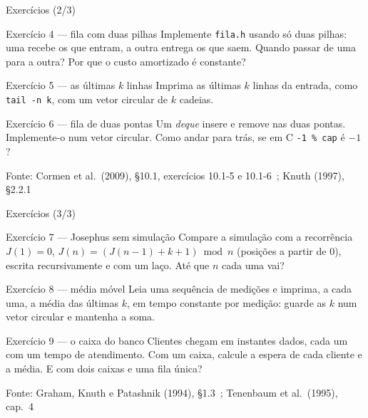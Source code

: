 \documentclass[aspectratio=169]{beamer}
\newcommand{\fonte}[1]{\vfill\hfill{\scriptsize\textcolor{UFSGray}{Fonte: #1}}}
\begin{document}
\begin{frame}{Exercícios (2/3)}
  \footnotesize
  \begin{block}{Exercício 4 --- fila com duas pilhas}
    Implemente \texttt{fila.h} usando só duas pilhas: uma recebe os que
    entram, a outra entrega os que saem. Quando passar de uma para a outra?
    Por que o custo amortizado é constante?
  \end{block}
  \begin{block}{Exercício 5 --- as últimas $k$ linhas}
    Imprima as últimas $k$ linhas da entrada, como \texttt{tail -n k}, com
    um vetor circular de $k$ cadeias.
  \end{block}
  \begin{block}{Exercício 6 --- fila de duas pontas}
    Um \emph{deque} insere e remove nas duas pontas. Implemente-o num vetor
    circular. Como andar para trás, se em C \texttt{-1 \% cap} é $-1$?
  \end{block}
  \fonte{Cormen et al.\ (2009), §10.1, exercícios 10.1-5 e 10.1-6~\cite{cormen2009introduction};
    Knuth (1997), §2.2.1~\cite{knuth1997art}}
\end{frame}

\begin{frame}{Exercícios (3/3)}
  \footnotesize
  \begin{block}{Exercício 7 --- Josephus sem simulação}
    Compare a simulação com a recorrência $J(1) = 0$,
    $J(n) = (J(n-1) + k + 1) \bmod n$ (posições a partir de 0), escrita
    recursivamente e com um laço. Até que $n$ cada uma vai?
  \end{block}
  \begin{block}{Exercício 8 --- média móvel}
    Leia uma sequência de medições e imprima, a cada uma, a média das últimas
    $k$, em tempo constante por medição: guarde as $k$ num vetor circular e
    mantenha a soma.
  \end{block}
  \begin{block}{Exercício 9 --- o caixa do banco}
    Clientes chegam em instantes dados, cada um com um tempo de atendimento.
    Com um caixa, calcule a espera de cada cliente e a média. E com dois
    caixas e uma fila única?
  \end{block}
  \fonte{Graham, Knuth e Patashnik (1994), §1.3~\cite{graham1994concrete};
    Tenenbaum et al.\ (1995), cap.~4~\cite{tenenbaum1995estruturas}}
\end{frame}
\end{document}
